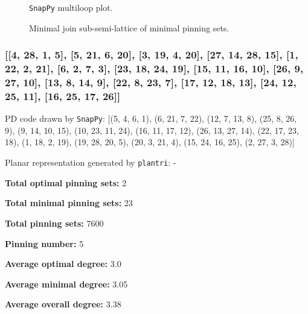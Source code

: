 \documentclass{article}%
\begin{document}
\begin{multicols}{2}
\begin{figure}[H]
\centering

\caption{\texttt{SnapPy} multiloop plot.}
\label{fig:tex/img/[[10, 20, 1, 11], [11, 21, 12, 24], [9, 23, 10, 24], [19, 22, 20, 23], [1, 22, 2, 21], [12, 8, 13, 9], [13, 18, 14, 19], [2, 7, 3, 8], [17, 28, 18, 25], [14, 6, 15, 7], [3, 26, 4, 25], [4, 16, 5, 17],.svg}
\end{figure}
\columnbreak

\begin{figure}[H]
\centering
\scalebox{0.8}{}
\caption{Minimal join sub-semi-lattice of minimal pinning sets.}
\label{fig:tex/img/[[10, 20, 1, 11], [11, 21, 12, 24], [9, 23, 10, 24], [19, 22, 20, 23], [1, 22, 2, 21], [12, 8, 13, 9], [13, 18, 14, 19], [2, 7, 3, 8], [17, 28, 18, 25], [14, 6, 15, 7], [3, 26, 4, 25], [4, 16, 5, 17],.pgf}
\end{figure}
\end{multicols}

\newpage

\subsubsection{[[4, 28, 1, 5], [5, 21, 6, 20], [3, 19, 4, 20], [27, 14, 28, 15], [1, 22, 2, 21], [6, 2, 7, 3], [23, 18, 24, 19], [15, 11, 16, 10], [26, 9, 27, 10], [13, 8, 14, 9], [22, 8, 23, 7], [17, 12, 18, 13], [24, 12, 25, 11], [16, 25, 17, 26]]}

{\small\noindent PD code drawn by \texttt{SnapPy}: [(5, 4, 6, 1), (6, 21, 7, 22), (12, 7, 13, 8), (25, 8, 26, 9), (9, 14, 10, 15), (10, 23, 11, 24), (16, 11, 17, 12), (26, 13, 27, 14), (22, 17, 23, 18), (1, 18, 2, 19), (19, 28, 20, 5), (20, 3, 21, 4), (15, 24, 16, 25), (2, 27, 3, 28)]}

{\small\noindent Planar representation generated by \texttt{plantri}: -}

\begin{multicols}{2}
{\normalsize \noindent\textbf{Total optimal pinning sets:} 2

\noindent\textbf{Total minimal pinning sets:} 23

\noindent\textbf{Total pinning sets:} 7600

\noindent\textbf{Pinning number:} 5

}
\columnbreak

{\normalsize \noindent\textbf{Average optimal degree:} 3.0

\noindent\textbf{Average minimal degree:} 3.05

\noindent\textbf{Average overall degree:} 3.38

}
\end{multicols}
\end{document}
